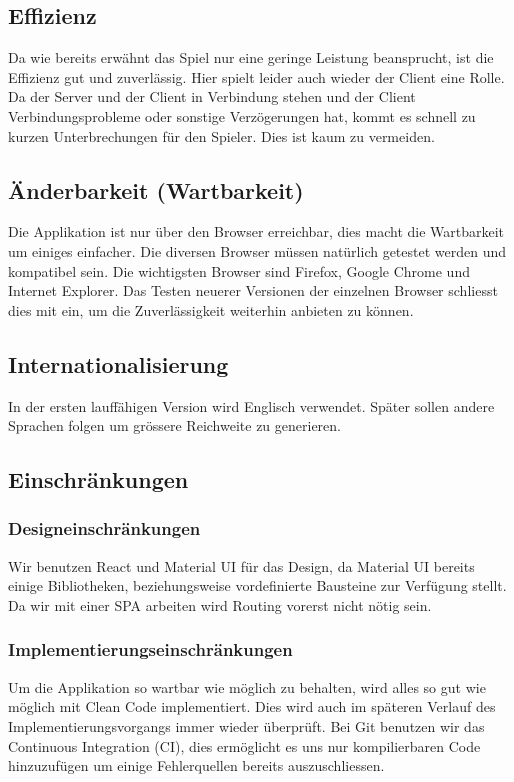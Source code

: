 \documentclass[11pt,ngerman]{article}
\begin{document}
        \subsection{Effizienz}
    	Da wie bereits erwähnt das Spiel nur eine geringe Leistung beansprucht, ist die Effizienz gut und zuverlässig. Hier spielt leider auch wieder der Client eine Rolle. Da der Server und der Client in Verbindung stehen und der Client Verbindungsprobleme oder sonstige Verzögerungen hat, kommt es schnell zu kurzen Unterbrechungen für den Spieler. Dies ist kaum zu vermeiden.
        \subsection{Änderbarkeit (Wartbarkeit)}
    	Die Applikation ist nur über den Browser erreichbar, dies macht die Wartbarkeit um einiges einfacher. Die diversen Browser müssen natürlich getestet werden und kompatibel sein. Die wichtigsten Browser sind Firefox, Google Chrome und Internet Explorer.  Das Testen neuerer Versionen der einzelnen Browser schliesst dies mit ein, um die Zuverlässigkeit weiterhin anbieten zu können.
        \subsection{Internationalisierung}
        In der ersten lauffähigen Version wird Englisch verwendet. Später sollen andere Sprachen folgen um grössere Reichweite zu generieren.
        \subsection{Einschränkungen}

        \subsubsection{Designeinschränkungen}
        Wir benutzen React und Material UI für das Design, da Material UI bereits einige Bibliotheken, beziehungsweise vordefinierte  Bausteine zur Verfügung stellt. Da wir mit einer \Gls{SPA} arbeiten wird Routing vorerst nicht nötig sein.
        \subsubsection{Implementierungseinschränkungen}
    	Um die Applikation so wartbar wie möglich zu behalten, wird alles so gut wie möglich mit Clean Code implementiert. Dies wird auch im späteren Verlauf des Implementierungsvorgangs immer wieder überprüft. Bei Git benutzen wir das \Gls{Continuous Integration} (CI), dies ermöglicht es uns nur kompilierbaren Code hinzuzufügen um einige Fehlerquellen bereits auszuschliessen.
\end{document}
